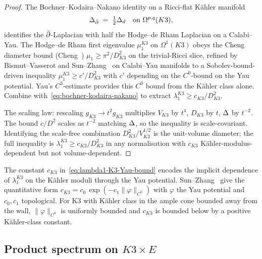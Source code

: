 \begin{proof}
The Bochner--Kodaira--Nakano identity on a Ricci-flat K\"ahler manifold
\begin{equation}
\label{eq:bochner-kodaira-nakano}
 \Delta_{\bar\partial} \;=\; \tfrac{1}{2}\Delta_d \quad \text{on } \Omega^{p,q}(K3),
\end{equation}
identifies the $\bar\partial$-Laplacian with half the Hodge--de Rham Laplacian
on a Calabi--Yau. The Hodge--de Rham first eigenvalue $\mu_1^{K3}$ on
$\Omega^1(K3)$ obeys the Cheng diameter bound
\textup{(}Cheng~\cite{Cheng1975}\textup{)}
$\mu_1 \geq \pi^2 / D_{K3}^2$ on the trivial-Ricci slice, refined by
Bismut--Vasserot and Sun--Zhang~\cite{SunZhang2014} on Calabi--Yau
manifolds to a Sobolev-bound-driven inequality
$\mu_1^{K3} \geq c'/D_{K3}^2$ with $c'$ depending on the $C^0$-bound on
the Yau potential. Yau's $C^3$-estimate provides this $C^0$ bound from
the K\"ahler class alone. Combine with~\eqref{eq:bochner-kodaira-nakano}
to extract $\lambda_1^{K3} \geq c_{K3} / D_{K3}^2$.

The scaling law: rescaling $g_{K3} \to t^2 g_{K3}$ multiplies $V_{K3}$
by $t^4$, $D_{K3}$ by $t$, $\Delta$ by $t^{-2}$. The bound $c/D^2$ scales
as $t^{-2}$ matching $\Delta$, so the inequality is scale-covariant.
Identifying the scale-free combination
$D_{K3}^2 / V_{K3}^{1/2}$ is the unit-volume diameter; the full
inequality is $\lambda_1^{K3} \geq c_{K3} / D_{K3}^2$ in any
normalisation with $c_{K3}$ K\"ahler-modulus-dependent but not
volume-dependent.
\end{proof}

\begin{remark}
\label{rem:yau-metric-implicit}
The constant $c_{K3}$ in~\eqref{eq:lambda1-K3-Yau-bound} encodes the
implicit dependence of $\lambda_1^{K3}$ on the K\"ahler moduli through
the Yau potential. Sun--Zhang~\cite{SunZhang2014} give the
quantitative form
$c_{K3} = c_0\, \exp(-c_1 \|\varphi\|_{C^0})$ with $\varphi$ the Yau
potential and $c_0, c_1$ topological. For K3 with K\"ahler class in the
ample cone bounded away from the wall, $\|\varphi\|_{C^0}$ is uniformly
bounded and $c_{K3}$ is bounded below by a positive K\"ahler-class
constant.
\end{remark}

\subsection{Product spectrum on $K3 \times E$}
\label{subsec:product-spectrum}

